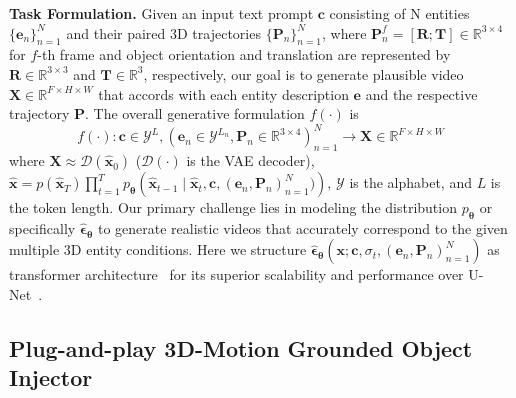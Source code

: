 \noindent \textbf{Task Formulation.} Given an input text prompt $\boldsymbol{c}$ consisting of N entities $\{\mathbf{e}_n\}_{n=1}^N$ and their paired 3D trajectories $\{\mathbf{P}_n\}_{n=1}^N$, where $\mathbf{P}_n^f=[\mathbf{R}; \mathbf{T}] \in \mathbb{R}^{3 \times 4}$ for $f$-th frame and object orientation and translation are represented by $\mathbf{R} \in \mathbb{R}^{3\times3}$ and $\mathbf{T} \in \mathbb{R}^{3}$, respectively, our goal is to generate plausible video $\mathbf{X} \in \mathbb{R}^{F \times H \times W}$ that accords with each entity description $\mathbf{e}$ and the respective trajectory $\mathbf{P}$. The overall generative formulation $f(\cdot)$ is 
\begin{equation}
f(\cdot): \mathbf{c} \in \mathcal{Y}^L, (\mathbf{e}_n \in \mathcal{Y}^{L_n},\mathbf{P}_n \in \mathbb{R}^{3 \times 4})_{n=1}^N \rightarrow \mathbf{X} \in \mathbb{R}^{F \times H \times W} 
\end{equation}
where $\mathbf{X} \approx \mathcal{D}(\hat{\mathbf{x}}_0)$ ($\mathcal{D}(\cdot)$ is the VAE decoder), $\hat{\mathbf{x}} = p\left(\hat{\mathbf{x}}_T \right) \prod_{t=1}^T p_{\boldsymbol{\theta}}\left(\hat{\mathbf{x}}_{t-1} \mid \hat{\mathbf{x}}_t, \mathbf{c}, (\mathbf{e}_n,\mathbf{P}_n)_{n=1}^N) \right)$, $\mathcal{Y}$ is the alphabet, and $L$ is the token length. Our primary challenge lies in modeling the distribution $p_{\boldsymbol{\theta}}$ or specifically $\hat{\boldsymbol{\epsilon}}_{\boldsymbol{\theta}}$ to generate realistic videos that accurately correspond to the given multiple 3D entity conditions. Here we structure $\hat{\boldsymbol{\epsilon}}_{\boldsymbol{\theta}}(\mathbf{x}; \boldsymbol{c}, \sigma_t, (\mathbf{e}_n,\mathbf{P}_n)_{n=1}^N)$ as transformer architecture~\citep{peebles2023scalable} for its superior scalability and performance over U-Net~\citep{ronneberger2015u}.

\subsection{Plug-and-play 3D-Motion Grounded Object Injector} \label{sec:3d_grounded_object_injector}

